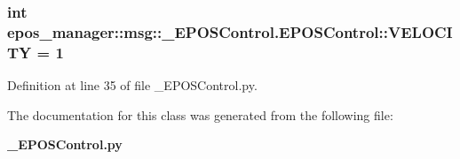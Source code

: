 \subsubsection[{\-V\-E\-L\-O\-C\-I\-T\-Y}]{\setlength{\rightskip}{0pt plus 5cm}int {\bf epos\-\_\-manager\-::msg\-::\-\_\-\-E\-P\-O\-S\-Control.\-E\-P\-O\-S\-Control\-::\-V\-E\-L\-O\-C\-I\-T\-Y} = 1\hspace{0.3cm}{\ttfamily  [static]}}\label{classepos__manager_1_1msg_1_1__EPOSControl_1_1EPOSControl_a79c1bfcd18a416d3a7e1bd627ac7fb40}


\-Definition at line 35 of file \-\_\-\-E\-P\-O\-S\-Control.\-py.



\-The documentation for this class was generated from the following file\-:\begin{DoxyCompactItemize}
\item 
{\bf \-\_\-\-E\-P\-O\-S\-Control.\-py}\end{DoxyCompactItemize}
